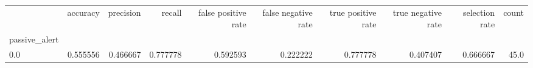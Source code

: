 \begin{tabular}{lrrrrrrrrr}
\toprule
{} &  accuracy &  precision &    recall &  false positive rate &  false negative rate &  true positive rate &  true negative rate &  selection rate &  count \\
passive\_alert &           &            &           &                      &                      &                     &                     &                 &        \\
\midrule
0.0           &  0.555556 &   0.466667 &  0.777778 &             0.592593 &             0.222222 &            0.777778 &            0.407407 &        0.666667 &   45.0 \\
\bottomrule
\end{tabular}
